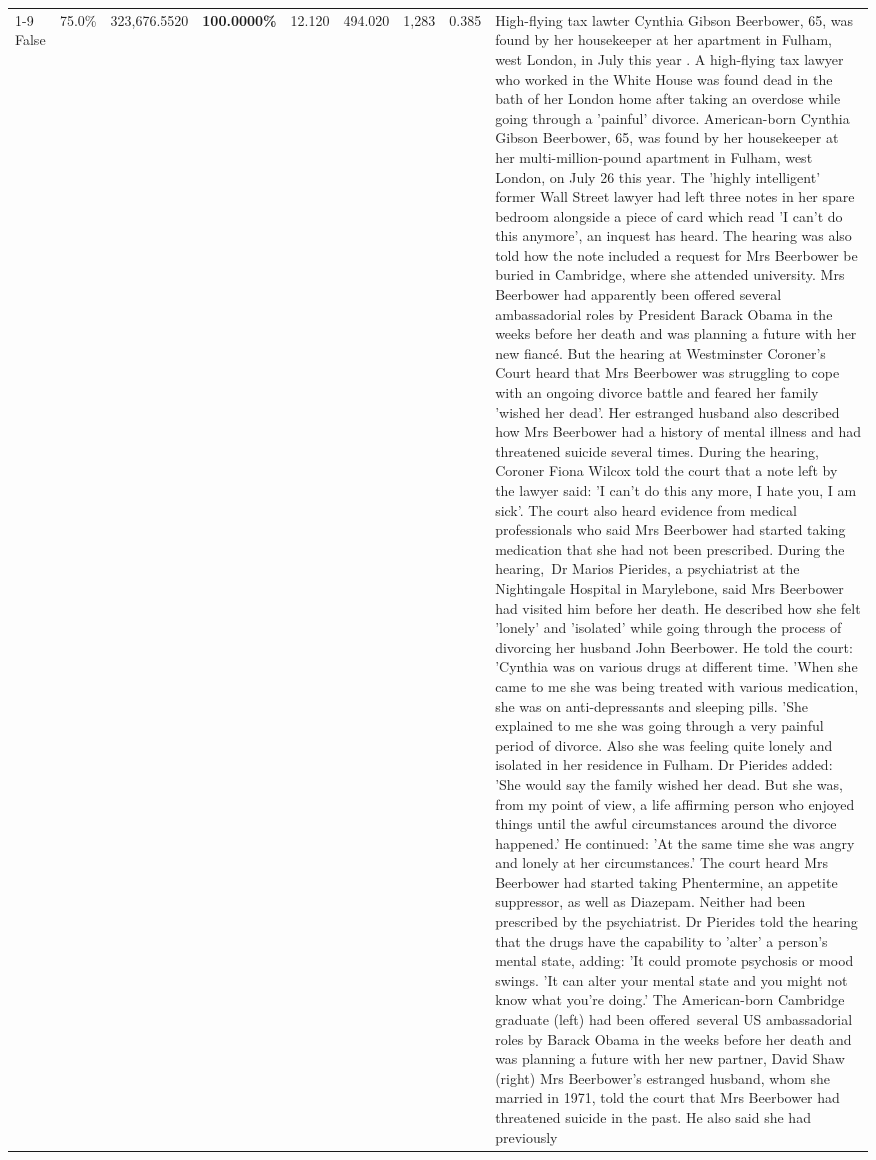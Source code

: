 \begin{table}[H]
\begin{tabular}{lllrlllll}
\cline{1-9}
False & 75.0\% & 323,676.5520 & \bfseries \color{red} 100.0000\% & 12.120 & 494.020 & 1,283 & 0.385 & High-flying tax lawter Cynthia Gibson Beerbower, 65, was found by her housekeeper at her apartment in Fulham, west London, in July this year . A high-flying tax lawyer who worked in the White House was found dead in the bath of her London home after taking an overdose while going through a 'painful' divorce. American-born Cynthia Gibson Beerbower, 65, was found by her housekeeper at her multi-million-pound apartment in Fulham, west London, on July 26 this year. The 'highly intelligent' former Wall Street lawyer had left three notes in her spare bedroom alongside a piece of card which read 'I can't do this anymore', an inquest has heard. The hearing was also told how the note included a request for Mrs Beerbower be buried in Cambridge, where she attended university. Mrs Beerbower had apparently been offered several ambassadorial roles by President Barack Obama in the weeks before her death and was planning a future with her new fiancé. But the hearing at Westminster Coroner's Court heard that Mrs Beerbower was struggling to cope with an ongoing divorce battle and feared her family 'wished her dead'. Her estranged husband also described how Mrs Beerbower had a history of mental illness and had threatened suicide several times. During the hearing, Coroner Fiona Wilcox told the court that a note left by the lawyer said: 'I can't do this any more, I hate you, I am sick'. The court also heard evidence from medical professionals who said Mrs Beerbower had started taking medication that she had not been prescribed. During the hearing, Dr Marios Pierides, a psychiatrist at the Nightingale Hospital in Marylebone, said Mrs Beerbower had visited him before her death. He described how she felt 'lonely' and 'isolated' while going through the process of divorcing her husband John Beerbower. He told the court: 'Cynthia was on various drugs at different time. 'When she came to me she was being treated with various medication, she was on anti-depressants and sleeping pills. 'She explained to me she was going through a very painful period of divorce. Also she was feeling quite lonely and isolated in her residence in Fulham. Dr Pierides added: 'She would say the family wished her dead. But she was, from my point of view, a life affirming person who enjoyed things until the awful circumstances around the divorce happened.' He continued: 'At the same time she was angry and lonely at her circumstances.' The court heard Mrs Beerbower had started taking Phentermine, an appetite suppressor, as well as Diazepam. Neither had been prescribed by the psychiatrist. Dr Pierides told the hearing that the drugs have the capability to 'alter' a person's mental state, adding: 'It could promote psychosis or mood swings. 'It can alter your mental state and you might not know what you're doing.' The American-born Cambridge graduate (left) had been offered several US ambassadorial roles by Barack Obama in the weeks before her death and was planning a future with her new partner, David Shaw (right) Mrs Beerbower's estranged husband, whom she married in 1971, told the court that Mrs Beerbower had threatened suicide in the past. He also said she had previously 
\end{tabular}
\end{table}
